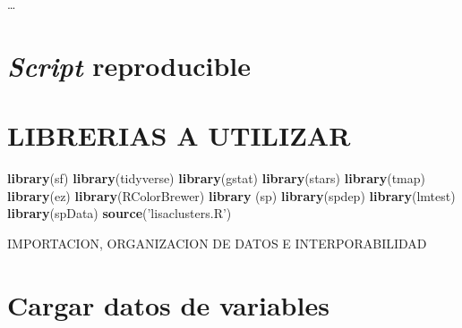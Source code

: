 \documentclass[11pt,]{article}
\newenvironment{Shaded}{\begin{snugshade}}{\end{snugshade}}
\newcommand{\KeywordTok}[1]{\textcolor[rgb]{0.13,0.29,0.53}{\textbf{#1}}}
\newcommand{\DataTypeTok}[1]{\textcolor[rgb]{0.13,0.29,0.53}{#1}}
\newcommand{\DecValTok}[1]{\textcolor[rgb]{0.00,0.00,0.81}{#1}}
\newcommand{\StringTok}[1]{\textcolor[rgb]{0.31,0.60,0.02}{#1}}
\newcommand{\OperatorTok}[1]{\textcolor[rgb]{0.81,0.36,0.00}{\textbf{#1}}}
\newcommand{\NormalTok}[1]{#1}
\begin{document}
\ldots

\section{\texorpdfstring{\emph{Script}
reproducible}{Script reproducible}}\label{script-reproducible}

\section{LIBRERIAS A UTILIZAR}\label{librerias-a-utilizar}

\begin{Shaded}
\begin{Highlighting}[]
\KeywordTok{library}\NormalTok{(sf)}
\KeywordTok{library}\NormalTok{(tidyverse)}
\KeywordTok{library}\NormalTok{(gstat)}
\KeywordTok{library}\NormalTok{(stars)}
\KeywordTok{library}\NormalTok{(tmap)}
\KeywordTok{library}\NormalTok{(ez)}
\KeywordTok{library}\NormalTok{(RColorBrewer)}
\KeywordTok{library}\NormalTok{ (sp)}
\KeywordTok{library}\NormalTok{(spdep) }
\KeywordTok{library}\NormalTok{(lmtest)}
\KeywordTok{library}\NormalTok{(spData)}
\KeywordTok{source}\NormalTok{(}\StringTok{'lisaclusters.R'}\NormalTok{)}
\end{Highlighting}
\end{Shaded}

IMPORTACION, ORGANIZACION DE DATOS E INTERPORABILIDAD

\section{Cargar datos de variables}\label{cargar-datos-de-variables}

\begin{Shaded}
\end{Shaded}
\end{document}
